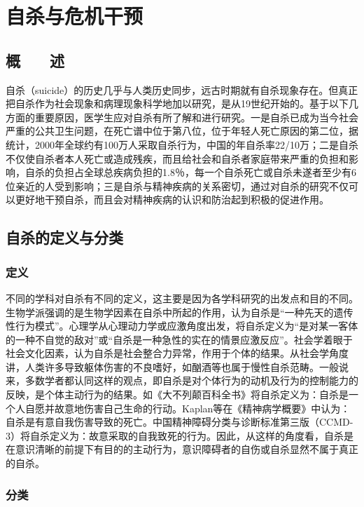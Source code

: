 \chapter{自杀与危机干预}

\section{概　　述}

自杀（suicide）的历史几乎与人类历史同步，远古时期就有自杀现象存在。但真正把自杀作为社会现象和病理现象科学地加以研究，是从19世纪开始的。基于以下几方面的重要原因，医学生应对自杀有所了解和进行研究。一是自杀已成为当今社会严重的公共卫生问题，在死亡谱中位于第八位，位于年轻人死亡原因的第二位，据统计，2000年全球约有100万人采取自杀行为，中国的年自杀率22/10万；二是自杀不仅使自杀者本人死亡或造成残疾，而且给社会和自杀者家庭带来严重的负担和影响，自杀的负担占全球总疾病负担的1.8％，每一个自杀死亡或自杀未遂者至少有6位亲近的人受到影响；三是自杀与精神疾病的关系密切，通过对自杀的研究不仅可以更好地干预自杀，而且会对精神疾病的认识和防治起到积极的促进作用。

\section{自杀的定义与分类}

\subsection{定义}

不同的学科对自杀有不同的定义，这主要是因为各学科研究的出发点和目的不同。生物学派强调的是生物学因素在自杀中所起的作用，认为自杀是“一种先天的遗传性行为模式”。心理学从心理动力学或应激角度出发，将自杀定义为“是对某一客体的一种不自觉的敌对”或“自杀是一种急性的实在的情景应激反应”。社会学着眼于社会文化因素，认为自杀是社会整合力异常，作用于个体的结果。从社会学角度讲，人类许多导致躯体伤害的不良嗜好，如酗酒等也属于慢性自杀范畴。一般说来，多数学者都认同这样的观点，即自杀是对个体行为的动机及行为的控制能力的反映，是个体主动行为的结果。如《大不列颠百科全书》将自杀定义为：自杀是一个人自愿并故意地伤害自己生命的行动。Kaplan等在《精神病学概要》中认为：自杀是有意自我伤害导致的死亡。中国精神障碍分类与诊断标准第三版（CCMD-3）将自杀定义为：故意采取的自我致死的行为。因此，从这样的角度看，自杀是在意识清晰的前提下有目的的主动行为，意识障碍者的自伤或自杀显然不属于真正的自杀。

\subsection{分类}

